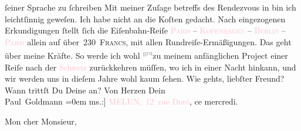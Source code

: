                ſeiner Sprache zu ſchreiben{\dotsfive}\pend
           \pstart
           Mit meiner Zuſage betreffs des Rendezvous in \label{K_L02777-4v}\label{K_L02777-4h} bin ich leichtſinnig geweſen. Ich habe nicht an die Koſten gedacht. Nach
               eingezogenen Erkundigungen ſtellt ſich die Eiſenbahn-Reiſe \textsc{\textcolor{pink}{Paris}{}\ledrightnote{\textcolor{pink}{Paris}} – \textcolor{pink}{Kopenhagen}{}\ledrightnote{\textcolor{pink}{Kopenhagen}} – \textcolor{pink}{Berlin}{}\ledrightnote{\textcolor{pink}{Berlin}} – \textcolor{pink}{Paris}{}\ledrightnote{\textcolor{pink}{Paris}}} allein {\pb}auf über 230 \textsc{Francs}, mit allen Rundreiſe-Ermäßigungen. Das geht über meine Kräfte. So
               werde ich wohl \substVorne{}\textsuperscript{\textcolor{gray}{gru}}\substDazwischen{}zu\substHinten{} meinem anfänglichen Project einer Reiſe nach der \textcolor{pink}{Schweiz}{}\ledrightnote{\textcolor{pink}{Schweiz}} zurückkehren müſſen, wo ich in einer Nacht hinkann,
               und wir werden uns in dieſem Jahre wohl kaum ſehen.\pend
           \pstart
           Wie gehts, liebſter Freund?\pend
           \pstart
           Wann trittſt Du Deine \label{K_L02777-8v}\label{K_L02777-8h}
               an?\pend
           \pstart
           Von Herzen Dein {\\[\baselineskip]}\spacefill\mbox{Paul Goldmann}\pend
           \leftskip=0em{}{\bigskip}\pstart
           \raggedleft{}{\pb}{[}ms.:{]} \textcolor{pink}{MELUN, 12 rue Doré}{}\ledrightnote{\textcolor{pink}{Rue Doré}}, ce
                     mercredi.\pend
           \pstart{}\begin{otherlanguage}{french}Mon cher Monsieur,\end{otherlanguage}\pend\pstart
